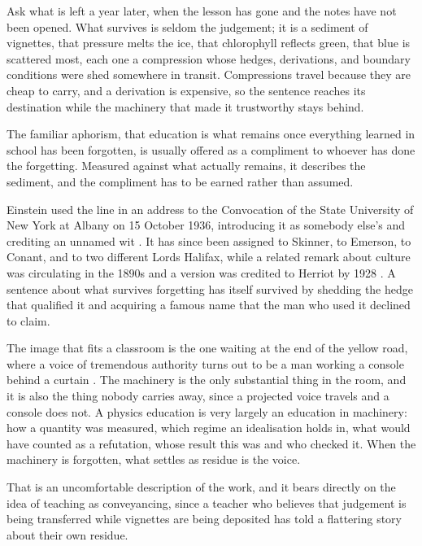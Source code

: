 Ask what is left a year later, when the lesson has gone and the notes have not been opened. What survives is seldom the judgement; it is a sediment of vignettes, that pressure melts the ice, that chlorophyll reflects green, that blue is scattered most, each one a compression whose hedges, derivations, and boundary conditions were shed somewhere in transit. Compressions travel because they are cheap to carry, and a derivation is expensive, so the sentence reaches its destination while the machinery that made it trustworthy stays behind.

The familiar aphorism, that education is what remains once everything learned in school has been forgotten, is usually offered as a compliment to whoever has done the forgetting. Measured against what actually remains, it describes the sediment, and the compliment has to be earned rather than assumed.

\begin{provenance}
Einstein used the line in an address to the Convocation of the State University of New York at Albany on 15 October 1936, introducing it as somebody else's and crediting an unnamed wit \citep{einstein1950}. It has since been assigned to Skinner, to Emerson, to Conant, and to two different Lords Halifax, while a related remark about culture was circulating in the 1890s and a version was credited to Herriot by 1928 \citep{qi2014}. A sentence about what survives forgetting has itself survived by shedding the hedge that qualified it and acquiring a famous name that the man who used it declined to claim.
\end{provenance}

The image that fits a classroom is the one waiting at the end of the yellow road, where a voice of tremendous authority turns out to be a man working a console behind a curtain \citep{baum1900}. The machinery is the only substantial thing in the room, and it is also the thing nobody carries away, since a projected voice travels and a console does not. A physics education is very largely an education in machinery: how a quantity was measured, which regime an idealisation holds in, what would have counted as a refutation, whose result this was and who checked it. When the machinery is forgotten, what settles as residue is the voice.

That is an uncomfortable description of the work, and it bears directly on the idea of teaching as conveyancing, since a teacher who believes that judgement is being transferred while vignettes are being deposited has told a flattering story about their own residue.

